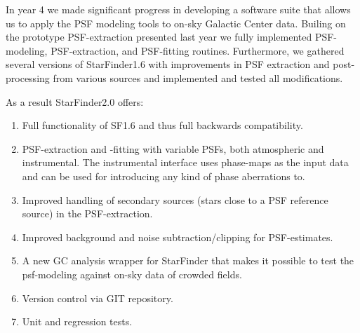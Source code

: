 In year 4 we made significant progress in developing a software suite that allows us to apply the PSF modeling tools to on-sky Galactic Center data. Builing on the prototype PSF-extraction presented last year we fully implemented PSF-modeling, PSF-extraction, and PSF-fitting routines. Furthermore, we gathered several versions of StarFinder1.6 with improvements in PSF extraction and post-processing from various sources and implemented and tested all modifications.

As a result StarFinder2.0 offers:
\begin{enumerate}
\item Full functionality of SF1.6 and thus full backwards compatibility.
\item PSF-extraction and -fitting with variable PSFs, both atmospheric and instrumental. The instrumental interface uses phase-maps as the input data and can be used for introducing any kind of phase aberrations to.
\item Improved handling of secondary sources (stars close to a PSF reference source) in the PSF-extraction.
\item Improved background and noise subtraction/clipping for PSF-estimates.
\item A new GC analysis wrapper for StarFinder that makes it possible to test the psf-modeling against on-sky data of crowded fields.
\item Version control via GIT repository.
\item Unit and regression tests.
\end{enumerate}
  
  